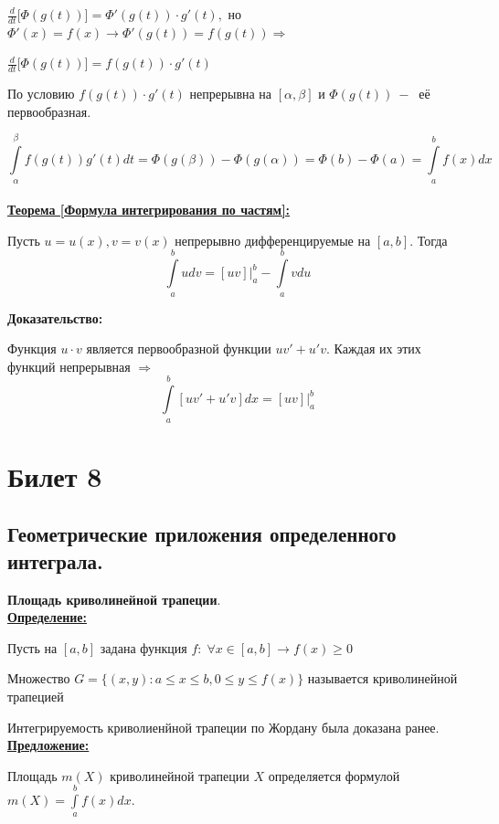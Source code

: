 \documentclass[a4paper,12pt]{article} %
\renewcommand {\geq}{\geqslant}
\renewcommand {\leq}{\leqslant}
\begin{document}
$\frac{d}{dt}\Big[\Phi(g(t))\Big]= \Phi'(g(t))\cdot g'(t),$ но $\Phi'(x) = f(x) \rightarrow \Phi'(g(t))= f(g(t))\Rightarrow$

$\frac{d}{dt}\Big[\Phi(g(t))\Big]=f(g(t))\cdot g'(t)$

По условию $f(g(t))\cdot g'(t)$ непрерывна на $[\alpha, 
\beta]$ и $\Phi(g(t))~-~$ её первообразная.

$$\int\limits_\alpha^\beta f(g(t))g'(t)dt = \Phi(g(\beta))- \Phi(g(\alpha))= \Phi(b) - \Phi(a) = \int\limits_a^b f(x)dx $$\\

\underline{\textbf{Теорема [Формула интегрирования по частям]:}}

Пусть $u = u(x), v= v(x)$ непрерывно дифференцируемые на $[a,b]$. Тогда $$\int\limits_a^b udv = [uv]|^b_a - \int\limits_a^b vdu$$

\textbf{Доказательство:}

Функция $u \cdot v$ является первообразной функции $uv'+u'v$. Каждая их этих функций непрерывная $\Rightarrow$
$$\int\limits_a^b[uv'+u'v]dx = [uv]|^b_a$$


\newpage
\section{Билет 8}

\subsection{Геометрические приложения определенного интеграла.}

\noindent \textbf{Площадь криволинейной трапеции}.\\

\underline{\textbf{Определение:}}


Пусть на $[a, b]$ задана функция $f:\; \forall x \in[a, b] \rightarrow f(x) \geq 0$

Множество $G=\{(x,y): a\leq x \leq b, 0 \leq y \leq f(x)\}$ называется криволинейной трапецией

Интегрируемость криволиенйной трапеции по Жордану была доказана ранее.\\

\underline{\textbf{Предложение:}}

Площадь $m(X)$ криволинейной трапеции $X$ определяется формулой $m(X) = \int\limits_a^b f(x)dx$.\\
\end{document}

